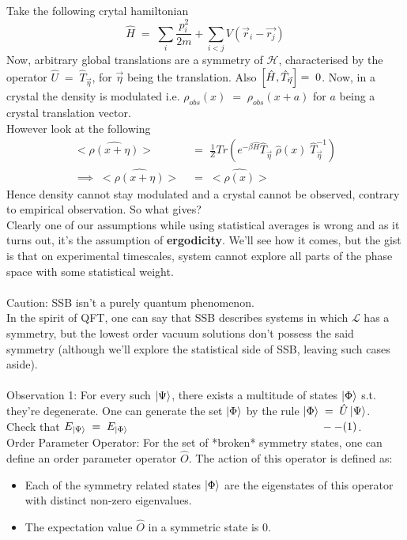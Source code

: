 \documentclass[12pt]{article}
\begin{document}
Take the following crytal hamiltonian
$$\hat{H}\;=\;\sum_i \frac{p_i^2}{2m}+\sum_{i<j}V(\Vec{r}_i-\Vec{r_j})$$
Now, arbitrary global translations are a symmetry of $\mathcal{H}$, characterised by the operator $\hat{U}\;=\;\hat{T}_{\Vec{\eta}}$, for $\Vec{\eta}$ being the translation. Also $\comm{\hat{H}}{\hat{T}_{\Vec{\eta}}}=\;0$. Now, in a crystal the density is modulated i.e. $\rho_{obs}(x)\;=\;\rho_{obs}(x+a)$ for $a$ being a crystal translation vector.\\
However look at the following
\begin{align*}
    <\hat{\rho(x+\eta)}> &= \;\frac{1}{Z}Tr(e^{-\beta \hat{H}}\hat{T}_{\Vec{\eta}}\;\hat{\rho}(x)\;\hat{T}^{-1}_{\Vec{\eta}} ) \\
    \implies\; <\hat{\rho(x+\eta)}>\;&=\; <\hat{\rho(x)}>
\end{align*}
Hence density cannot stay modulated and a crystal cannot be observed, contrary to empirical observation. So what gives?\\
Clearly one of our assumptions while using statistical averages is wrong and as it turns out, it's the assumption of \textbf{ergodicity}. We'll see how it comes, but the gist is that on experimental timescales, system cannot explore all parts of the phase space with some statistical weight.\\
\\
Caution: SSB isn't a purely quantum phenomenon.\\
\newline
In the spirit of QFT, one can say that SSB describes systems in which $\mathcal{L}$ has a symmetry, but the lowest order vacuum solutions don't possess the said symmetry (although we'll explore the statistical side of SSB, leaving such cases aside).\\
\\
Observation 1: For every such $\ket{\Psi}$, there exists a multitude of states $\ket{\Phi}$ s.t. they're degenerate.
One can generate the set {$\ket{\Phi}$} by the rule $\ket{\Phi}\;=\;\hat{U}\ket{\Psi}$.\\
Check that $E_{\ket{\Psi}}\;=\;E_{\ket{\Phi}}\;\;\;\;\;\;\;\;\;\;\;\;\;\;\;\;\;\;\;\;\;\;\;\;\;\;\;\;\;\;\;\;\;\;\;\;\;\;\;\;\;\;\;\;\;\;\;\;\;\;\;\;\;\;\;\;\;\;\;\;\;\;\;--(1)$.\\
\newline
Order Parameter Operator: For the set of *broken* symmetry states, one can define an order parameter operator $\hat{O}$.
The action of this operator is defined as:
\begin{itemize}
    \item
        Each of the symmetry related states {$\ket{\Phi}$} are the eigenstates of this operator with distinct non-zero eigenvalues.
    \item The expectation value $\hat{O}$ in a symmetric state is 0.
\end{itemize}
\end{document}
